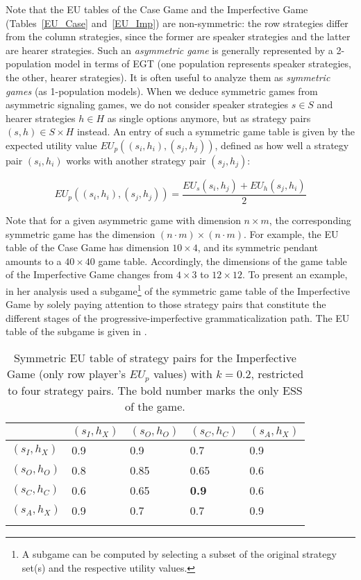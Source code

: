\documentclass[output=paper,hidelinks]{langscibook}
\begin{document}
Note that the EU tables of the Case Game and the Imperfective Game (Tables~\ref{EU_Case} and~\ref{EU_Imp}) are non-symmetric: the row strategies differ from the column strategies, since the former are speaker strategies and the latter are hearer strategies. Such an \emph{asymmetric game} is generally represented by a 2-population model in terms of EGT (one population represents speaker strategies, the other, hearer strategies). It is often useful to analyze them as \emph{symmetric games} (as 1-population models). When we  deduce symmetric games from asymmetric signaling games, we do not consider speaker strategies $s \in S$ and hearer strategies $h \in H$ as single options anymore, but as strategy pairs $(s,h) \in S \times H$ instead. An entry of such a symmetric game table is given by the expected utility value $EU_p((s_i,h_i),(s_j,h_j))$, defined as how well a strategy pair $(s_i,h_i)$ works with another strategy pair $(s_j,h_j)$:

\[EU_p((s_i,h_i),(s_j,h_j)) =  \frac{EU_s(s_i,h_j) + EU_h(s_j,h_i)}{2}\]

Note that for a given asymmetric game with dimension $n \times m$, the corresponding symmetric game has the dimension $(n\cdot m)\times (n\cdot m)$. For example, the EU table of the Case Game has dimension $10 \times 4$, and its symmetric pendant amounts to a $40 \times 40$ game table. Accordingly, the dimensions of the  game table of the Imperfective Game  changes from $4 \times 3$ to $12 \times 12$. 
To present an example, in her analysis \citet{Deo_2015} used a subgame\footnote{A subgame can be computed by selecting a subset of the original strategy set(s) and the respective utility values.} of the symmetric game table of the Imperfective Game by solely paying attention to those strategy pairs that constitute the different stages of the progressive-imperfective grammaticalization path. The EU table of the subgame is given in . 

\begin{table}
\begin{tabular}{l llll} 
\lsptoprule
 & \multicolumn{1}{c}{$(s_I, h_X)$} & \multicolumn{1}{c}{$(s_O, h_O)$} & \multicolumn{1}{c}{$(s_C, h_C)$} &  \multicolumn{1}{c}{$(s_A, h_X)$}\\\midrule
$(s_I, h_X)$   & 0.9  &  0.9  & 0.7 & 0.9  \\
$(s_O, h_O)$ & 0.8  &  0.85  & 0.65 & 0.6   \\
$(s_C, h_C)$ & 0.6  &  0.65  & \textbf{0.9} & 0.6   \\
$(s_A, h_X)$ & 0.9  &  0.7  & 0.7 & 0.9   \\
\lspbottomrule
\end{tabular}
\caption{Symmetric EU table of strategy pairs for the Imperfective Game (only row player's $EU_p$ values) with $k=0.2$, restricted to four strategy pairs. The bold number marks the only ESS of the game.\label{EU_Imp_sym}}
\end{table}
\end{document}
